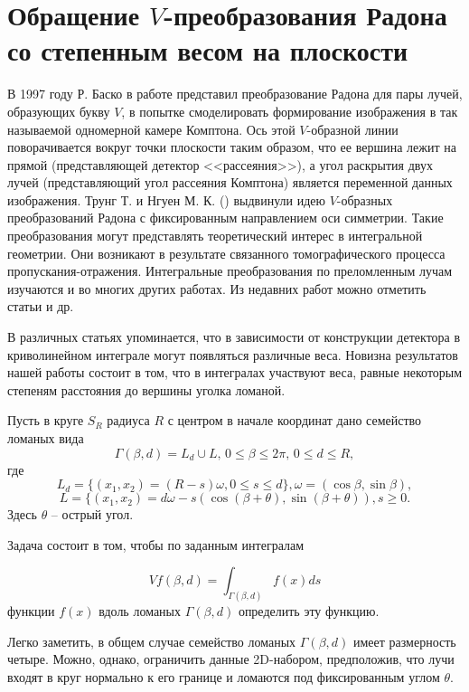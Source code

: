 ﻿\chapter{Обращение $V$-преобразования Радона со степенным весом на плоскости}\label{MZG}

В 1997 году Р. Баско в работе \cite{mzg-Basko} представил преобразование Радона для пары лучей, образующих букву $V$, в попытке смоделировать формирование изображения в так называемой одномерной камере Комптона. Ось этой $V$-образной линии поворачивается вокруг точки плоскости таким образом, что ее вершина лежит на прямой (представляющей детектор <<рассеяния>>), а угол раскрытия двух лучей (представляющий угол рассеяния Комптона) является переменной данных изображения.
Трунг Т. и Нгуен М. К. (\cite{mzg-Truong}) выдвинули идею $V$-образных преобразований Радона с фиксированным направлением оси симметрии. Такие преобразования могут представлять теоретический интерес в интегральной геометрии. Они возникают в результате связанного томографического процесса пропускания-отражения. Интегральные преобразования по преломленным лучам изучаются и во многих других работах. Из недавних работ можно отметить статьи \cite{mzg-Ambartsoumian2, mzg-Kuchment} и др.

В различных статьях упоминается, что в зависимости от конструкции детектора в криволинейном интеграле могут появляться различные веса. Новизна результатов нашей работы состоит в том, что в интегралах участвуют веса, равные некоторым степеням расстояния до вершины уголка ломаной.

Пусть в круге $S_R$ радиуса $R$ с центром в начале координат дано семейство ломаных вида
$$\Gamma(\beta,d)=L_d\cup L, \, 0\leq\beta\leq 2\pi, \, 0\leq d\leq R,$$
где
$$L_d=\{(x_1, x_2)=(R-s)\omega,  0\leq s\leq d\}, \omega=(\cos\beta, \sin \beta),$$
$$L=\{(x_1, x_2)=d\omega-s(\cos (\beta+\theta), \sin (\beta+\theta)), s\geq 0.$$
Здесь $\theta$ -- острый угол.

Задача состоит в том, чтобы по заданным интегралам

\begin{equation}
\label{mzg-eq-one3}
Vf(\beta,d)=\int_{\Gamma(\beta,d)}f(x)ds
\end{equation}
функции $f(x)$ вдоль ломаных $\Gamma(\beta,d)$ определить эту функцию.

Легко заметить, в общем случае семейство ломаных $\Gamma(\beta,d)$ имеет размерность четыре. Можно, однако, ограничить данные 2D-набором, предположив, что лучи входят в круг нормально к его границе и ломаются под фиксированным углом $\theta$.

